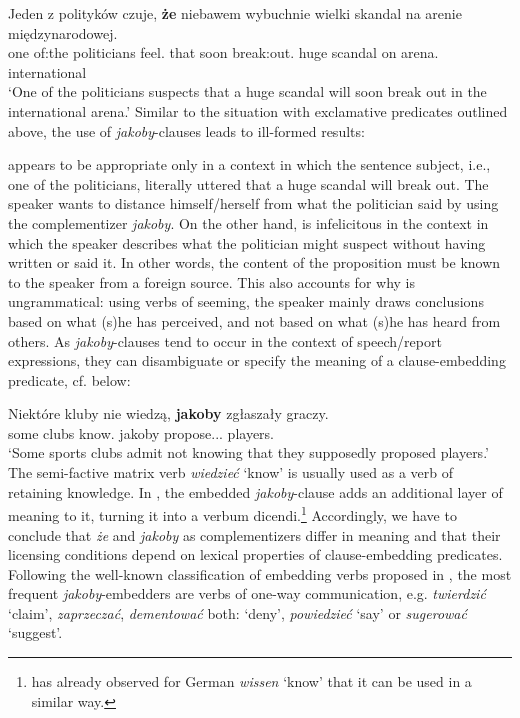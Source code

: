 \documentclass[output=paper]{langsci/langscibook}
\begin{document}
\ea \gll Jeden z polityków czuje, \textbf{że} niebawem wybuchnie wielki skandal na arenie międzynarodowej. \\
		one {of:the} politicians feel.{\thirdperson}{\sg} that soon {break:out}.{\thirdperson}{\sg} huge scandal on arena.{\LOC} international \\
\glt	`One of the politicians suspects that a huge scandal will soon break out in the international arena.'
\z
Similar to the situation with exclamative predicates outlined above, the use of \emph{jakoby}-clauses leads to ill-formed results:

\z
{} appears to be appropriate only in a context in which the sentence subject, i.e., one of the politicians, literally uttered that a huge scandal will break out. The speaker wants to distance himself\slash herself from what the politician said by using the complementizer \emph{jakoby}. On the other hand,   is infelicitous in the context in which the speaker describes what the politician might suspect without having written or said it. In other words, the content of the proposition must be known to the speaker from a foreign source. This also accounts for why  is ungrammatical: using verbs of seeming, the speaker mainly draws conclusions based on what (s)he has perceived, and not based on what (s)he has heard from others. As \emph{jakoby}-clauses tend to occur in the context of speech\slash report expressions, they can disambiguate or specify the meaning of a clause-embedding predicate, cf.  below:

\ea\label{wiedziec} \gll Niektóre kluby nie wiedzą, \textbf{jakoby} zgłaszały graczy.\\
		some clubs {\negation} know.{\thirdperson}{\pl} jakoby propose.{\lptcp}.{\nvir}.{\pl} players.{\acc}\\
		\glt `Some sports clubs admit not knowing that they supposedly proposed players.'  
\z
The semi-factive matrix verb \emph{wiedzieć} `know' is usually used as a verb of retaining knowledge. In , the embedded \emph{jakoby}-clause adds an additional layer of meaning to it, turning it into a verbum dicendi.\footnote{\textcite[142--148]{Reis1977} has already observed for German \emph{wissen} `know' that it can be used in a similar way.}
Accordingly, we have to conclude that \emph{że} and \emph{jakoby} as complementizers differ in meaning and that their licensing conditions depend on lexical properties of clause-embedding predicates. Following the well-known classification of embedding verbs proposed in \textcite{Karttunen:1977}, the most frequent \emph{jakoby}-embedders are verbs of one-way communication, e.g. \emph{twierdzić} `claim', \emph{zaprzeczać}, \emph{dementować} both: `deny', \emph{powiedzieć} `say' or \emph{sugerować} `suggest'.\largerpage[-2]
\end{document}
